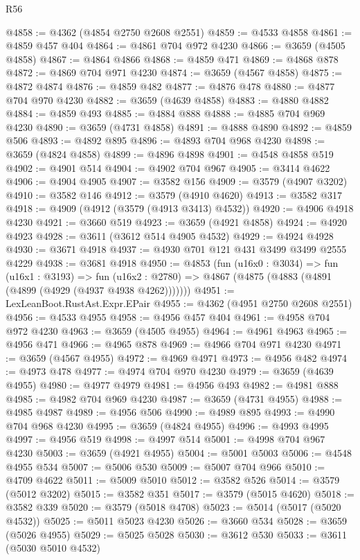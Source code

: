 \begin{lexlean}{R56}
\begin{coremodule}
@4858 := @4362 (@4854 @2750 @2608 @2551)
@4859 := @4533 @4858
@4861 := @4859 @457 @404
@4864 := @4861 @704 @972 @4230
@4866 := @3659 (@4505 @4858)
@4867 := @4864 @4866
@4868 := @4859 @471
@4869 := @4868 @878
@4872 := @4869 @704 @971 @4230
@4874 := @3659 (@4567 @4858)
@4875 := @4872 @4874
@4876 := @4859 @482
@4877 := @4876 @478
@4880 := @4877 @704 @970 @4230
@4882 := @3659 (@4639 @4858)
@4883 := @4880 @4882
@4884 := @4859 @493
@4885 := @4884 @888
@4888 := @4885 @704 @969 @4230
@4890 := @3659 (@4731 @4858)
@4891 := @4888 @4890
@4892 := @4859 @506
@4893 := @4892 @895
@4896 := @4893 @704 @968 @4230
@4898 := @3659 (@4824 @4858)
@4899 := @4896 @4898
@4901 := @4548 @4858 @519
@4902 := @4901 @514
@4904 := @4902 @704 @967
@4905 := @3414 @4622
@4906 := @4904 @4905
@4907 := @3582 @156
@4909 := @3579 (@4907 @3202)
@4910 := @3582 @146
@4912 := @3579 (@4910 @4620)
@4913 := @3582 @317
@4918 := @4909 (@4912 (@3579 (@4913 @3413) @4532))
@4920 := @4906 @4918 @4230
@4921 := @3660 @519
@4923 := @3659 (@4921 @4858)
@4924 := @4920 @4923
@4928 := @3611 (@3612 @514 @4905 @4532)
@4929 := @4924 @4928
@4930 := @3671 @4918
@4937 := @4930 @701 @121 @431 @3499 @3499 @2555 @4229
@4938 := @3681 @4918
@4950 := @4853
    (fun (u16x0 : @3034) =>
    fun (u16x1 : @3193) =>
    fun (u16x2 : @2780) => @4867 (@4875 (@4883 (@4891 (@4899 (@4929 (@4937 @4938 @4262)))))))
@4951 := LexLeanBoot.RustAst.Expr.EPair
@4955 := @4362 (@4951 @2750 @2608 @2551)
@4956 := @4533 @4955
@4958 := @4956 @457 @404
@4961 := @4958 @704 @972 @4230
@4963 := @3659 (@4505 @4955)
@4964 := @4961 @4963
@4965 := @4956 @471
@4966 := @4965 @878
@4969 := @4966 @704 @971 @4230
@4971 := @3659 (@4567 @4955)
@4972 := @4969 @4971
@4973 := @4956 @482
@4974 := @4973 @478
@4977 := @4974 @704 @970 @4230
@4979 := @3659 (@4639 @4955)
@4980 := @4977 @4979
@4981 := @4956 @493
@4982 := @4981 @888
@4985 := @4982 @704 @969 @4230
@4987 := @3659 (@4731 @4955)
@4988 := @4985 @4987
@4989 := @4956 @506
@4990 := @4989 @895
@4993 := @4990 @704 @968 @4230
@4995 := @3659 (@4824 @4955)
@4996 := @4993 @4995
@4997 := @4956 @519
@4998 := @4997 @514
@5001 := @4998 @704 @967 @4230
@5003 := @3659 (@4921 @4955)
@5004 := @5001 @5003
@5006 := @4548 @4955 @534
@5007 := @5006 @530
@5009 := @5007 @704 @966
@5010 := @4709 @4622
@5011 := @5009 @5010
@5012 := @3582 @526
@5014 := @3579 (@5012 @3202)
@5015 := @3582 @351
@5017 := @3579 (@5015 @4620)
@5018 := @3582 @339
@5020 := @3579 (@5018 @4708)
@5023 := @5014 (@5017 (@5020 @4532))
@5025 := @5011 @5023 @4230
@5026 := @3660 @534
@5028 := @3659 (@5026 @4955)
@5029 := @5025 @5028
@5030 := @3612 @530
@5033 := @3611 (@5030 @5010 @4532)

\end{coremodule}
\end{lexlean}
